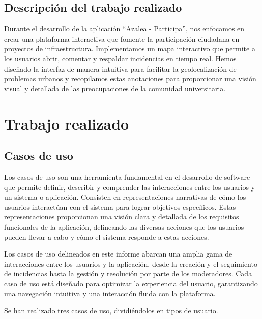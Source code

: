 \documentclass{article}
\begin{document}
\subsection{Descripción del trabajo realizado}

Durante el desarrollo de la aplicación ``Azalea - Participa'', nos enfocamos en crear una plataforma interactiva que fomente la participación ciudadana en proyectos de infraestructura. Implementamos un mapa interactivo que permite a los usuarios abrir, comentar y respaldar incidencias en tiempo real. Hemos diseñado la interfaz de manera intuitiva para facilitar la geolocalización de problemas urbanos y recopilamos estas anotaciones para proporcionar una visión visual y detallada de las preocupaciones de la comunidad universitaria.

\newpage

\section{Trabajo realizado}

\subsection{Casos de uso}

Los casos de uso son una herramienta fundamental en el desarrollo de software que permite definir, describir y comprender las interacciones entre los usuarios y un sistema o aplicación. Consisten en representaciones narrativas de cómo los usuarios interactúan con el sistema para lograr objetivos específicos. Estas representaciones proporcionan una visión clara y detallada de los requisitos funcionales de la aplicación, delineando las diversas acciones que los usuarios pueden llevar a cabo y cómo el sistema responde a estas acciones.

Los casos de uso delineados en este informe abarcan una amplia gama de interacciones entre los usuarios y la aplicación, desde la creación y el seguimiento de incidencias hasta la gestión y resolución por parte de los moderadores. Cada caso de uso está diseñado para optimizar la experiencia del usuario, garantizando una navegación intuitiva y una interacción fluida con la plataforma.

Se han realizado tres casos de uso, dividiéndolos en tipos de usuario.
\end{document}
